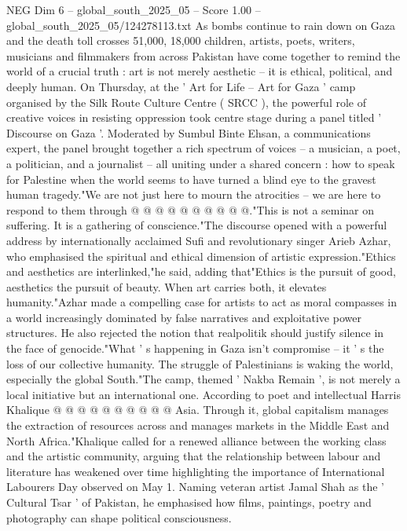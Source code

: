 \begin{textsample}{NEG Dim 6 – global\_south\_2025\_05 – Score 1.00 – global\_south\_2025\_05/124278113.txt}  \label{ex:f6_neg_421}
As bombs continue to rain down on Gaza and the death toll crosses 51,000, 18,000 children, artists, poets, writers, musicians and filmmakers from across Pakistan have come together to remind the world of a crucial truth : art is not merely aesthetic -- it is ethical, political, and deeply human.
On Thursday, at the ' Art for Life -- Art for Gaza ' camp organised by the Silk Route Culture Centre ( SRCC ), the powerful role of creative voices in resisting oppression took centre stage during a panel titled ' Discourse on Gaza '.
Moderated by Sumbul Binte Ehsan, a communications expert, the panel brought together a rich spectrum of voices -- a musician, a poet, a politician, and a journalist -- all uniting under a shared concern : how to speak for Palestine when the world seems to have turned a blind eye to the gravest human tragedy."We are not just here to mourn the atrocities -- we are here to respond to them through @ @ @ @ @ @ @ @ @ @."This is not a seminar on suffering.
It is a gathering of conscience."The discourse opened with a powerful address by internationally acclaimed Sufi and revolutionary singer Arieb Azhar, who emphasised the spiritual and ethical dimension of artistic expression."Ethics and aesthetics are interlinked,"he said, adding that"Ethics is the pursuit of good, aesthetics the pursuit of beauty.
When art carries both, it elevates humanity."Azhar made a compelling case for artists to act as moral compasses in a world increasingly dominated by false narratives and exploitative power structures.
He also rejected the notion that realpolitik should justify silence in the face of genocide."What ' s happening in Gaza isn't compromise -- it ' s the loss of our collective humanity.
The struggle of Palestinians is waking the world, especially the global South."The camp, themed ' Nakba Remain ', is not merely a local initiative but an international one.
According to poet and intellectual Harris Khalique @ @ @ @ @ @ @ @ @ @ Asia.
Through it, global capitalism manages the extraction of resources across and manages markets in the Middle East and North Africa."Khalique called for a renewed alliance between the working class and the artistic community, arguing that the relationship between labour and literature has weakened over time highlighting the importance of International Labourers Day observed on May 1.
Naming veteran artist Jamal Shah as the ' Cultural Tsar ' of Pakistan, he emphasised how films, paintings, poetry and photography can shape political consciousness.

\end{textsample}
